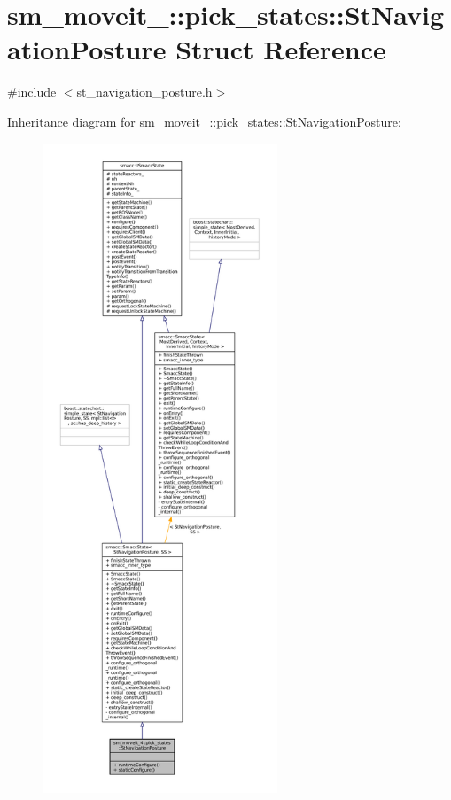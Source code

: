 \hypertarget{structsm__moveit__4_1_1pick__states_1_1StNavigationPosture}{}\section{sm\+\_\+moveit\+\_\+:\+:pick\+\_\+states\+:\+:St\+Navigation\+Posture Struct Reference}
\label{structsm__moveit__4_1_1pick__states_1_1StNavigationPosture}


{\ttfamily \#include $<$st\+\_\+navigation\+\_\+posture.\+h$>$}



Inheritance diagram for sm\+\_\+moveit\+\_\+:\+:pick\+\_\+states\+:\+:St\+Navigation\+Posture\+:
\nopagebreak
\begin{figure}[H]
\begin{center}
\leavevmode
\includegraphics[height=550pt]{structsm__moveit__4_1_1pick__states_1_1StNavigationPosture__inherit__graph}
\end{center}
\end{figure}


